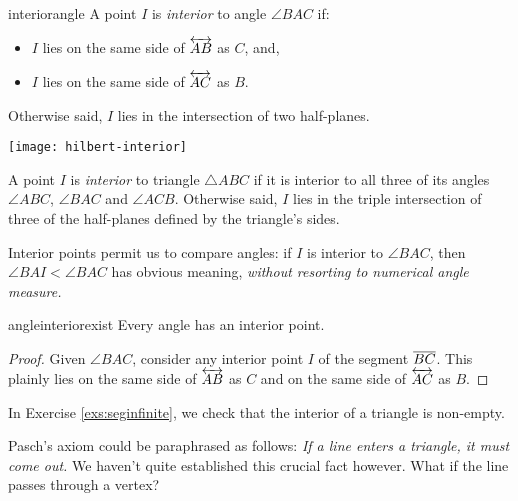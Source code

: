\begin{defn}{}{interiorangle}
	A point $I$ is \emph{interior} to angle $\angle BAC$ if:\par
	\begin{minipage}[t]{0.6\linewidth}\vspace{0pt}
		\begin{itemize}\itemsep0pt
	  	\item $I$ lies on the same side of $\overleftrightarrow{AB}$ as $C$, and,
	  	\item $I$ lies on the same side of $\overleftrightarrow{AC}$ as $B$.
		\end{itemize}
		Otherwise said, $I$ lies in the intersection of two half-planes.
	\end{minipage}
	\hfill
	\begin{minipage}[t]{0.35\linewidth}\vspace{-20pt}
		\flushright
		\texttt{[image: hilbert-interior]}
	\end{minipage}\medbreak
	
	A point $I$ is \emph{interior} to triangle $\triangle ABC$ if it is interior to all three of its angles $\angle ABC$, $\angle BAC$ and $\angle ACB$. Otherwise said, $I$ lies in the triple intersection of three of the half-planes defined by the triangle's sides.
\end{defn}

Interior points permit us to compare angles: if $I$ is interior to $\angle BAC$, then $\angle BAI<\angle BAC$ has obvious meaning, \emph{without resorting to numerical angle measure.}

\begin{cor}{}{angleinteriorexist}
	Every angle has an interior point.
\end{cor}

\begin{proof}
	Given $\angle BAC$, consider any interior point $I$ of the segment $\overline{BC}$. This plainly lies on the same side of $\overleftrightarrow{AB}$ as $C$ and on the same side of $\overleftrightarrow{AC}$ as $B$.
\end{proof}

In Exercise \ref{exs:seginfinite}, we check that the interior of a triangle is non-empty.
\vfil

\goodbreak

Pasch's axiom could be paraphrased as follows: \emph{If a line enters a triangle, it must come out.} We haven't quite established this crucial fact however. What if the line passes through a vertex?

